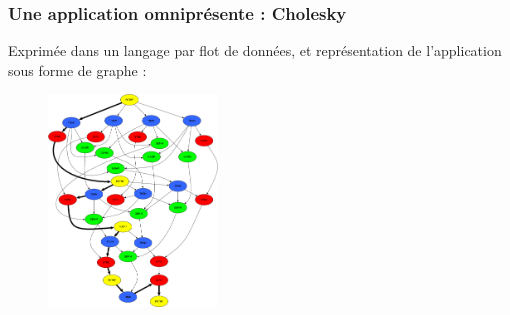 \documentclass[xcolor={usenames,dvipsnames,svgnames,table}, aspectratio=43]{beamer}
\begin{document}
\begin{frame}
\frametitle{Une application omniprésente : Cholesky}

Exprimée dans un langage par flot de données, et représentation de l'application sous forme de graphe :
\begin{figure}
  \includegraphics[width=0.4\textwidth]{graph/cholesky-dag-5.pdf}
\end{figure}


\end{frame}
\end{document}
